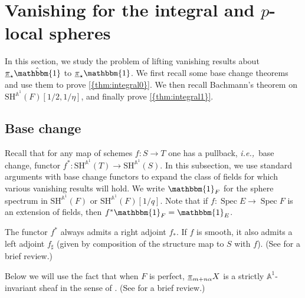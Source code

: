 \documentclass[10pt]{amsart}
\numberwithin{equation}{section}
\theoremstyle{plain}
\theoremstyle{definition}
\theoremstyle{remark}
\begin{document}
\section{Vanishing for the integral and $p$-local spheres}\label{sec:uncomp}

In this section, we study the problem of lifting vanishing results about ${\underline{\smash{\pi}}}_\star\hat{\mathbbm{1}}$ to ${\underline{\smash{\pi}}}_\star{\mathbbm{1}}$.  We first recall some base change theorems and use them to prove {\autoref{{thm:integral0}}}.  We then recall Bachmann's theorem on ${\mathrm{SH}^{{\mathbb{A}}^1}\!}(F)[1/2,1/\eta]$, and finally prove {\autoref{{thm:integral1}}}.

\subsection{Base change}\label{subsec:base}
Recall that for any map of schemes $f:S\to T$ one has a pullback, \emph{i.e.,}~base change, functor $f^*:{\mathrm{SH}^{{\mathbb{A}}^1}\!}(T)\to {\mathrm{SH}^{{\mathbb{A}}^1}\!}(S)$.  In this subsection, we use standard arguments with base change functors to expand the class of fields for which various vanishing results will hold.  We write ${\mathbbm{1}}_F$ for the sphere spectrum in ${\mathrm{SH}^{{\mathbb{A}}^1}\!}(F)$ or ${\mathrm{SH}^{{\mathbb{A}}^1}\!}(F)[1/q]$.  Note that if $f:{\operatorname{Spec}} E\to {\operatorname{Spec}} F$ is an extension of fields, then $f^*{\mathbbm{1}}_F = {\mathbbm{1}}_E$.

The functor $f^*$ always admits a right adjoint $f_*$.  If $f$ is smooth, it also admits a left adjoint $f_\sharp$ (given by composition of the structure map to $S$ with $f$).  (See \cite[Appendix A]{Hoyois} for a brief review.)

Below we will use the fact that when $F$ is perfect, ${\underline{\smash{\pi}}}_{m+n\alpha}X$ is a strictly ${\mathbb{A}}^1$-invariant sheaf in the sense of \cite{morel:A1}.  (See \cite[\S1.2]{Hoyois} for a brief review.)
\end{document}
